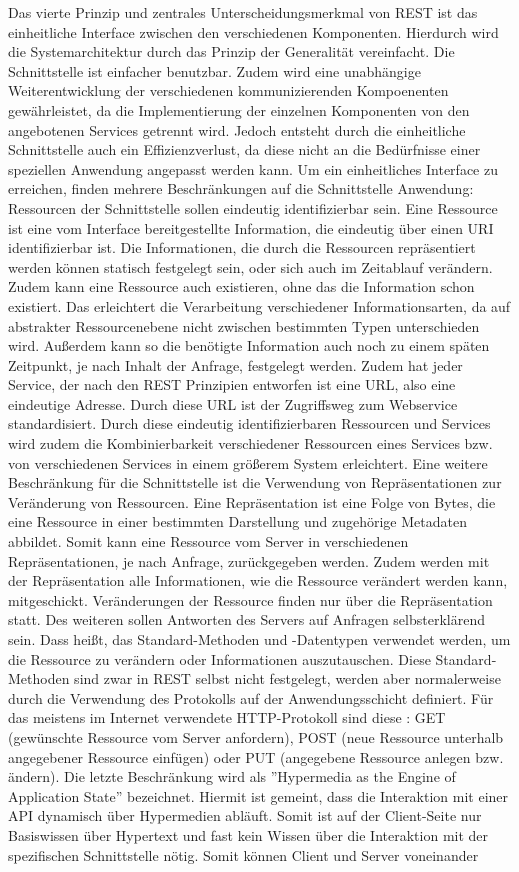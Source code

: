 Das vierte Prinzip und zentrales Unterscheidungsmerkmal von REST ist das einheitliche Interface zwischen den verschiedenen Komponenten. Hierdurch wird die Systemarchitektur durch das Prinzip der Generalität vereinfacht. Die Schnittstelle ist einfacher benutzbar. Zudem wird eine unabhängige Weiterentwicklung der verschiedenen kommunizierenden Kompoenenten gewährleistet, da die Implementierung der einzelnen Komponenten von den angebotenen Services getrennt wird. Jedoch entsteht durch die einheitliche Schnittstelle auch ein Effizienzverlust, da diese nicht an die Bedürfnisse einer speziellen Anwendung angepasst werden kann.
Um ein einheitliches Interface zu erreichen, finden mehrere Beschränkungen auf die Schnittstelle Anwendung: Ressourcen der Schnittstelle sollen eindeutig identifizierbar sein. Eine Ressource ist eine vom Interface bereitgestellte Information, die eindeutig über einen URI identifizierbar ist. Die Informationen, die durch die Ressourcen repräsentiert werden können statisch festgelegt sein, oder sich auch im Zeitablauf verändern. Zudem kann eine Ressource auch existieren, ohne das die Information schon existiert. Das erleichtert die Verarbeitung verschiedener Informationsarten, da auf abstrakter Ressourcenebene nicht zwischen bestimmten Typen unterschieden wird. Außerdem kann so die benötigte Information auch noch zu einem späten Zeitpunkt, je nach Inhalt der Anfrage, festgelegt werden. Zudem hat jeder Service, der nach den REST Prinzipien entworfen ist eine URL, also eine eindeutige Adresse. Durch diese URL ist der Zugriffsweg zum Webservice standardisiert. Durch diese eindeutig identifizierbaren Ressourcen und Services wird zudem die Kombinierbarkeit verschiedener Ressourcen eines Services bzw. von verschiedenen Services in einem größerem System erleichtert. Eine weitere Beschränkung für die Schnittstelle ist die Verwendung von Repräsentationen zur Veränderung von Ressourcen. Eine Repräsentation ist eine Folge von Bytes, die eine Ressource in einer bestimmten Darstellung und zugehörige Metadaten abbildet. Somit kann eine Ressource vom Server in verschiedenen Repräsentationen, je nach Anfrage, zurückgegeben werden. Zudem werden mit der Repräsentation alle Informationen, wie die Ressource verändert werden kann, mitgeschickt. Veränderungen der Ressource finden nur über die Repräsentation statt. Des weiteren sollen Antworten des Servers auf Anfragen selbsterklärend sein. Dass heißt, das Standard-Methoden und -Datentypen verwendet werden, um die Ressource zu verändern oder Informationen auszutauschen. Diese Standard-Methoden sind zwar in REST selbst nicht festgelegt, werden aber normalerweise durch die Verwendung des Protokolls auf der Anwendungsschicht definiert. Für das meistens im Internet verwendete HTTP-Protokoll sind diese \zB: GET (gewünschte Ressource vom Server anfordern), POST (neue Ressource unterhalb angegebener Ressource einfügen) oder PUT (angegebene Ressource anlegen bzw. ändern). Die letzte Beschränkung wird als ''Hypermedia as the Engine of Application State'' bezeichnet. Hiermit ist gemeint, dass die Interaktion mit einer API dynamisch über Hypermedien abläuft. Somit ist auf der Client-Seite nur Basiswissen über Hypertext und fast kein Wissen über die Interaktion mit der spezifischen Schnittstelle nötig. Somit können Client und Server voneinander 